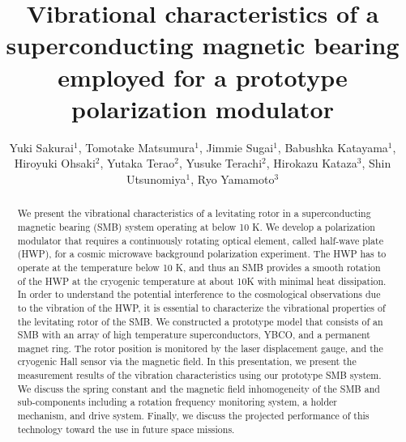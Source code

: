 \documentclass[a4paper]{jpconf}
\begin{document}
\title{Vibrational characteristics of a superconducting magnetic bearing employed for a prototype polarization modulator}

\author{Yuki Sakurai$^{1}$, Tomotake Matsumura$^{1}$, Jimmie Sugai$^{1}$, Babushka Katayama$^{1}$, Hiroyuki Ohsaki$^{2}$, Yutaka Terao$^{2}$, Yusuke Terachi$^{2}$, Hirokazu Kataza$^{3}$, Shin Utsunomiya$^{1}$, Ryo Yamamoto$^{3}$}
\vspace{2mm}
\address{
$^{1}$Kavli Institute for the Physics and Mathematics of the Universe (WPI),The University of Tokyo Institutes for Advanced Study, The University of Tokyo, 5-1-5 Kashiwanoha, Kashiwa, Chiba 277-8583, Japan \\
$^{2}$Graduate School of Frontier Sciences, The University of Tokyo, 5-1-5 Kashiwanoha, Kashiwa, Chiba 277-8561, Japan \\
$^{3}$Japan Aerospace Exploration Agency, Institute of Space and Astronautical Science (ISAS), 3-1-1 Yoshinodai, Chuo-ku, Sagamihara, Kanagawa 252-5210, Japan
}


\begin{abstract}
We present the vibrational characteristics of a levitating rotor in a superconducting magnetic bearing (SMB) system operating at below 10 K.
We develop a polarization modulator that requires a continuously rotating optical element, called half-wave plate (HWP), for a cosmic microwave background polarization experiment.
The HWP has to operate at the temperature below 10 K, and thus an SMB provides a smooth rotation of the HWP at the cryogenic temperature at about 10K with minimal heat dissipation.
In order to understand the potential interference to the cosmological observations due to the vibration of the HWP,
it is essential to characterize the vibrational properties of the levitating rotor of the SMB.
We constructed a prototype model that consists of an SMB with an array of high temperature superconductors, YBCO, and a permanent magnet ring.
The rotor position is monitored by the laser displacement gauge, and the cryogenic Hall sensor via the magnetic field.
In this presentation, we present the measurement results of the vibration characteristics using our prototype SMB system.
We discuss the spring constant and the magnetic field inhomogeneity of the SMB and sub-components including a rotation frequency monitoring system, a holder mechanism, and drive system.
Finally, we discuss the projected performance of this technology toward the use in future space missions.
\end{abstract}
\end{document}

